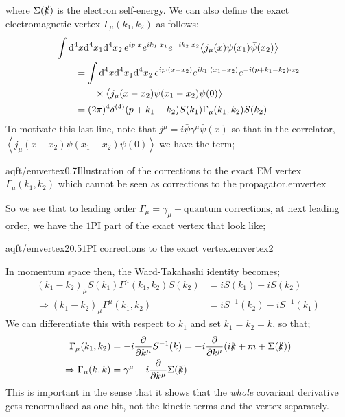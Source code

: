where $\Sigma(\slashed{k})$ is the electron self-energy. We can also define the exact electromagnetic vertex $\Gamma_\mu(k_1, k_2)$ as follows;
\begin{align*}
&\int{\ud^4 x\ud^4 x_1 \upd{^4 x_2}e^{ip\cdot x}e^{ik_1\cdot x_1}e^{-ik_2\cdot x_2}\left< j_\mu(x)\psi(x_1)\bar{\psi}(x_2) \right>} \\
&\qquad= \int{\ud^4 x\ud^4 x_1 \upd{^4 x_2}e^{ip\cdot(x - x_2)}e^{ik_1\cdot(x_1 - x_2)}e^{-i(p + k_1 - k_2)\cdot x_2}} \\
&\qquad \qquad \times \left< j_\mu(x - x_2) \psi(x_1 - x_2) \bar{\psi}(0)\right> \\
&\qquad = (2\pi)^4 \delta^{(4)}(p + k_1 - k_2)S(k_1) \Gamma_\mu(k_1, k_2)S(k_2)
\end{align*}
To motivate this last line, note that $j^{\mu} = i\bar{\psi}\gamma^{\mu}\bar{\psi}(x)$ so that in the correlator, $\left< j_\mu(x - x_2) \psi(x_1 - x_2) \bar{\psi}(0)\right>$ we have the term;
\begin{mygraphic}{aqft/emvertex}{0.7}{Illustration of the corrections to the exact EM vertex $\Gamma_\mu(k_1, k_2)$ which cannot be seen as corrections to the propagator.}{emvertex}\end{mygraphic}
So we see that to leading order $\Gamma_\mu = \gamma_\mu + \text{quantum corrections}$, at next leading order, we have the $1$PI part of the exact vertex that look like;
\begin{mygraphic}{aqft/emvertex2}{0.5}{$1$PI corrections to the exact vertex.}{emvertex2}\end{mygraphic}
In momentum space then, the Ward-Takahashi identity becomes;
\begin{align*}
(k_1 - k_2)_{\mu}S(k_1)\Gamma^{\mu}(k_1, k_2)S(k_2) &= i S(k_1) - iS(k_2) \\
\Rightarrow (k_1 - k_2)_\mu \Gamma^{\mu}(k_1, k_2) &= iS^{-1}(k_2) - iS^{-1}(k_1)
\end{align*}
We can differentiate this with respect to $k_1$ and set $k_1 = k_2 = k$, so that;
\begin{align*}
\Gamma_\mu(k_1, k_2) &= -i\frac{\del}{\del k^{\mu}}S^{-1}(k) = -i\frac{\del}{\del k^{\mu}}\left(i \slashed{k} + m + \Sigma(\slashed{k})\right) \\
\Rightarrow \Gamma_{\mu}(k, k) &= \gamma^{\mu} - i\frac{\del}{\del k^{\mu}}\Sigma(\slashed{k})
\end{align*}
This is important in the sense that it shows that the \emph{whole} covariant derivative gets renormalised as one bit, not the kinetic terms and the vertex separately. 
\newpage
